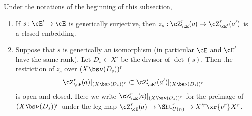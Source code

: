 \begin{lemma}
\notready\label{l:change E} Under the  notations of the beginning of this subsection,
\begin{enumerate}
\item If $s:\cE'\to \cE$ is generically surjective, then $z_{s}:\cZ^{r}_{\cE}(a)\to \cZ^{r}_{\cE'}(a')$ is a closed embedding.
\item Suppose that $s$ is generically an isomorphism (in particular $\cE$ and $\cE'$ have the same rank). Let $D_{s}\subset X'$ be the divisor of $\det(s)$. Then the restriction of $z_{s}$ over $(X\bs \nu(D_{s}))^{r}$
\begin{equation}
\cZ^{r}_{\cE}(a)|_{(X\bs \nu(D_{s}))^{r}}\subset \cZ^{r}_{\cE'}(a')|_{(X\bs \nu(D_{s}))^{r}}
\end{equation}
is open and closed. Here we write $\cZ^{r}_{\cE}(a)|_{(X\bs \nu(D_{s}))^{r}}$ for the preimage of $(X\bs \nu(D_{s}))^{r}$ under the leg map $\cZ^{r}_{\cE}(a)\to \Sht^{r}_{U(n)}\to X'^{r}\xr{\nu^{r}} X^{r}$.
\end{enumerate}
\end{lemma}
